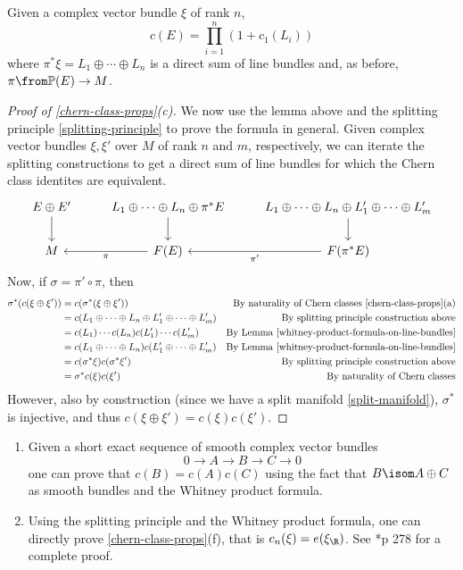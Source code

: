 \documentclass[11pt,leqno,oneside]{amsbook}
\renewcommand{\P}{\mathbb{P}}
\numberwithin{thm}{section}
\begin{document}
\begin{cor}\label{chern-classes-are-elementary-symmetric-functions}
  Given a complex vector bundle \(\xi\) of rank \(n\), \[
    c(E) = \prod_{i=1}^n (1+c_1(L_i))
  \]
  where \(\pi^* \xi = L_1 \oplus \cdots \oplus L_n\) is a direct sum
  of line bundles and, as before, \(\pi \from \P(E) \to M\).
\end{cor}
\begin{proof}[Proof of \ref{chern-class-props}(c)]
  We now use the lemma above and the splitting principle
  \ref{splitting-principle} to prove the
  formula in general. Given complex vector bundles \(\xi, \xi'\) over
  \(M\) of rank \(n\) and \(m\), respectively,
  we can iterate the splitting constructions to get a direct sum of
  line bundles for which the Chern class identites are equivalent. \[
    \begin{tikzcd}
      E \oplus E' \ar[d] & L_1 \oplus \cdots \oplus L_n \oplus \pi^* E
      \ar[d] & L_1
      \oplus \cdots \oplus L_n \oplus L_1' \oplus \cdots \oplus L_m' \ar[d]
      \\
      M & \ar[l, "\pi"] F(E) & \ar[l,"\pi'"] F(\pi^*E)
    \end{tikzcd}
  \]
  Now, if \(\sigma = \pi' \circ \pi\), then
  \begin{align*}
    \sigma^*(c(\xi \oplus \xi'))
    & = c(\sigma^*(\xi \oplus \xi'))
    & \text{By naturality of Chern classes \ref{chern-class-props}(a)}\\
    & = c(L_1 \oplus \cdots \oplus L_n \oplus L_1' \oplus \cdots
      \oplus L_m')
    & \text{By splitting principle construction above}\\
    & = c(L_1) \cdots c(L_n) c(L_1') \cdots c(L_m')
    & \text{By Lemma \ref{whitney-product-formula-on-line-bundles}} \\
    & = c(L_1 \oplus \cdots \oplus L_n) c(L_1' \oplus \cdots \oplus
      L_m')
    & \text{By Lemma \ref{whitney-product-formula-on-line-bundles}}\\
    & = c(\sigma^* \xi) c(\sigma^* \xi') 
    & \text{By splitting principle construction above} \\
    & = \sigma^* c(\xi)c(\xi')
    & \text{By naturality of Chern classes}
  \end{align*}
  However, also by construction (since we have a split manifold
  \ref{split-manifold}), \(\sigma^*\) is injective, and thus \(c(\xi
  \oplus \xi') = c(\xi)c(\xi')\).
\end{proof}
\begin{rmk}
  \begin{enumerate}
  \item Given a short exact sequence of smooth complex vector
    bundles \[
      0 \to A \to B \to C \to 0
    \]
    one can prove that \(c(B) = c(A)c(C)\) using the fact that \(B \isom A
    \oplus C\) as smooth bundles and the Whitney product formula.
  \item Using the splitting principle and the Whitney product formula,
    one can directly prove \ref{chern-class-props}(f), that is
    \(c_n(\xi) = e(\xi_\R)\). See \cite{bott-tu}*{p 278} for a
    complete proof.
  \end{enumerate}
\end{rmk}
\end{document}

